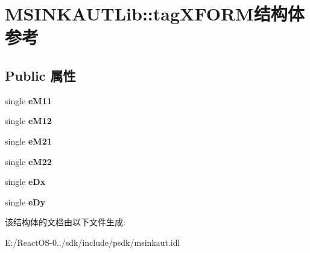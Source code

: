 \hypertarget{struct_m_s_i_n_k_a_u_t_lib_1_1tag_x_f_o_r_m}{}\section{M\+S\+I\+N\+K\+A\+U\+T\+Lib\+:\+:tag\+X\+F\+O\+R\+M结构体 参考}
\label{struct_m_s_i_n_k_a_u_t_lib_1_1tag_x_f_o_r_m}
\subsection*{Public 属性}
\begin{DoxyCompactItemize}
\item 
\mbox{\label{struct_m_s_i_n_k_a_u_t_lib_1_1tag_x_f_o_r_m_a98a0d8b0529a599c6eb96d23137b6693}} 
single {\bfseries e\+M11}
\item 
\mbox{\label{struct_m_s_i_n_k_a_u_t_lib_1_1tag_x_f_o_r_m_a36959763eea91de9408d97cdebf53d87}} 
single {\bfseries e\+M12}
\item 
\mbox{\label{struct_m_s_i_n_k_a_u_t_lib_1_1tag_x_f_o_r_m_a98911f807738cac373cbfc00397c5efc}} 
single {\bfseries e\+M21}
\item 
\mbox{\label{struct_m_s_i_n_k_a_u_t_lib_1_1tag_x_f_o_r_m_a9ecd771b3d4e43b2c5000c293cc3d49f}} 
single {\bfseries e\+M22}
\item 
\mbox{\label{struct_m_s_i_n_k_a_u_t_lib_1_1tag_x_f_o_r_m_af229104314b3d5c64f6ec07262978e3e}} 
single {\bfseries e\+Dx}
\item 
\mbox{\label{struct_m_s_i_n_k_a_u_t_lib_1_1tag_x_f_o_r_m_a053b314b7e8132cc2a7a350707df9754}} 
single {\bfseries e\+Dy}
\end{DoxyCompactItemize}


该结构体的文档由以下文件生成\+:\begin{DoxyCompactItemize}
\item 
E\+:/\+React\+O\+S-\/0../sdk/include/psdk/msinkaut.\+idl\end{DoxyCompactItemize}
